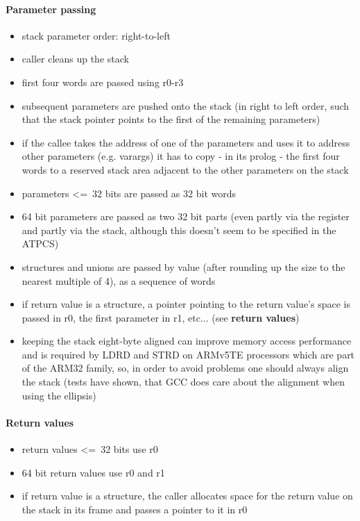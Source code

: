 \paragraph{Parameter passing}

\begin{itemize}
\item stack parameter order: right-to-left
\item caller cleans up the stack
\item first four words are passed using r0-r3
\item subsequent parameters are pushed onto the stack (in right to left order, such that the stack pointer points to the first of the remaining parameters)
\item if the callee takes the address of one of the parameters and uses it to address other parameters (e.g. varargs) it has to copy - in its prolog - the first four words to a reserved stack area adjacent to the other parameters on the stack
\item parameters \textless=\ 32 bits are passed as 32 bit words
\item 64 bit parameters are passed as two 32 bit parts (even partly via the register and partly via the stack, although this doesn't seem to be specified in the ATPCS)
\item structures and unions are passed by value (after rounding up the size to the nearest multiple of 4), as a sequence of words
\item if return value is a structure, a pointer pointing to the return value's space is passed in r0, the first parameter in r1, etc... (see {\bf return values})
\item keeping the stack eight-byte aligned can improve memory access performance and is required by LDRD and STRD on ARMv5TE processors which are part of the ARM32 family, so, in order to avoid problems one should always align the stack (tests have shown, that GCC does care about the alignment when using the ellipsis)
\end{itemize}

\paragraph{Return values}
\begin{itemize}
\item return values \textless=\ 32 bits use r0
\item 64 bit return values use r0 and r1
\item if return value is a structure, the caller allocates space for the return value on the stack in its frame and passes a pointer to it in r0
\end{itemize}


